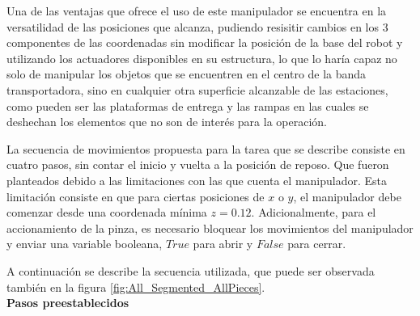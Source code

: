 Una de las ventajas que ofrece el uso de este manipulador se encuentra en la versatilidad de las posiciones que alcanza, pudiendo resisitir cambios en los 3 componentes de las coordenadas sin modificar la posición de la base del robot y utilizando los actuadores disponibles en su estructura, lo que lo haría capaz no solo de manipular los objetos que se encuentren en el centro de la banda transportadora, sino en cualquier otra superficie alcanzable de las estaciones, como pueden ser las plataformas de entrega y las rampas en las cuales se deshechan los elementos que no son de interés para la operación. 

La secuencia de movimientos propuesta para la tarea que se describe consiste en cuatro pasos, sin contar el inicio y vuelta a la posición de reposo. Que fueron planteados debido a las limitaciones con las que cuenta el manipulador. Esta limitación consiste en que para ciertas posiciones de $x$ o $y$, el manipulador debe comenzar desde una coordenada mínima $z = 0.12$. Adicionalmente, para el accionamiento de la pinza, es necesario bloquear los movimientos del manipulador y enviar una variable booleana, $True$ para abrir y $False$ para cerrar.

A continuación se describe la secuencia utilizada, que puede ser observada también en la figura \ref{fig:All_Segmented_AllPieces}.\\

\textbf{Pasos preestablecidos}

